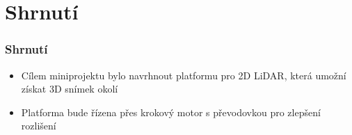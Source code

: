\documentclass[169]{beamer}
\begin{document}
\section{Shrnutí}
\begin{frame}
    \frametitle{Shrnutí}
    \begin{itemize}
    \item Cílem miniprojektu bylo navrhnout platformu pro 2D LiDAR, která umožní získat 3D snímek okolí\pause
    \item Platforma bude řízena přes krokový motor s převodovkou pro zlepšení rozlišení
    \end{itemize}
\end{frame}
\end{document}
